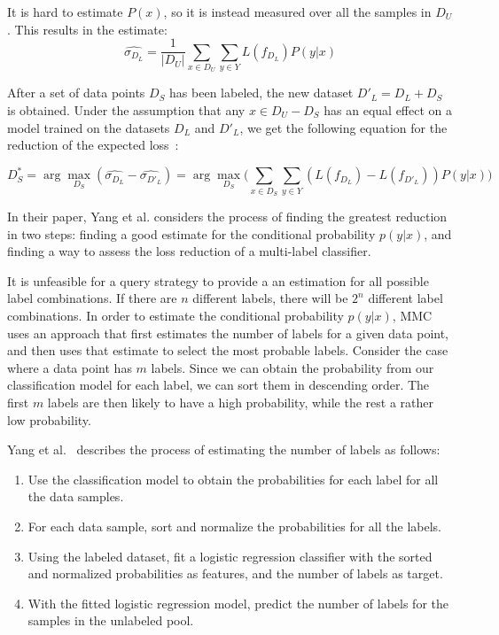 It is hard to estimate $P(x)$, so it is instead measured over all the samples in $D_U$.
This results in the estimate:
\begin{equation}
    \widehat{\sigma_{D_L}} = \frac{1}{|D_U|} \sum_{x \in D_U} \sum_{y \in Y} L(f_{D_L})P(y|x)
\end{equation}

After a set of data points $D_S$ has been labeled, the new dataset $D'_L=D_L + D_S$ is obtained.
Under the assumption that any $x \in D_U - D_S$ has an equal effect on a model trained on the datasets $D_L$ and $D'_L$, we get the following equation for the reduction of the expected loss~\cite{yang2009effective}:

\begin{equation}
    D^*_S = \arg\max_{D_S}(\widehat{\sigma_{D_L}} - \widehat{\sigma_{D'_L}}) = \arg\max_{D_S} \big ( \sum_{x \in D_S} \sum_{y \in Y} (L(f_{D_L}) - L(f_{D'_L})) P(y|x) \big )
\end{equation}

In their paper, Yang et al\@. considers the process of finding the greatest reduction in two steps: finding a good estimate for the conditional probability $p(y|x)$, and finding a way to assess the loss reduction of a multi-label classifier.

It is unfeasible for a query strategy to provide a an estimation for all possible label combinations.
If there are $n$ different labels, there will be $2^n$ different label combinations.
In order to estimate the conditional probability $p(y|x)$, MMC uses an approach that first estimates the number of labels for a given data point, and then uses that estimate to select the most probable labels.
Consider the case where a data point has $m$ labels.
Since we can obtain the probability from our classification model for each label, we can sort them in descending order.
The first $m$ labels are then likely to have a high probability, while the rest a rather low probability.

Yang et al\@.~\cite{yang2009effective} describes the process of estimating the number of labels as follows:
\begin{enumerate}
    \item Use the classification model to obtain the probabilities for each label for all the data samples.
    \item For each data sample, sort and normalize the probabilities for all the labels.
    \item Using the labeled dataset, fit a logistic regression classifier with the sorted and normalized probabilities as features, and the number of labels as target.
    \item With the fitted logistic regression model, predict the number of labels for the samples in the unlabeled pool.
\end{enumerate}

